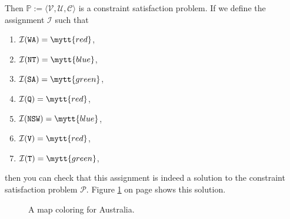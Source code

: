 Then $\mathbb{P} := \langle \mathcal{V}, \mathcal{U}, \mathcal{C} \rangle$ is a constraint satisfaction problem.  
If we define the assignment $\mathcal{I}$ such that
\begin{enumerate}
\item $\mathcal{I}(\mathtt{WA}) = \mytt{red}$,
\item $\mathcal{I}(\mathtt{NT}) = \mytt{blue}$,
\item $\mathcal{I}(\mathtt{SA}) = \mytt{green}$,
\item $\mathcal{I}(\mathtt{Q}) = \mytt{red}$,
\item $\mathcal{I}(\mathtt{NSW}) = \mytt{blue}$,
\item $\mathcal{I}(\mathtt{V}) = \mytt{red}$,
\item $\mathcal{I}(\mathtt{T}) = \mytt{green}$,
\end{enumerate}
then you can check that this assignment  is indeed a solution to the constraint satisfaction problem $\mathcal{P}$.
Figure \ref{fig:australia-solution.png} on page \pageref{fig:australia-solution.png} shows this solution.

\begin{figure}[!ht]
  \centering
  \caption{A map coloring for Australia.}
  \label{fig:australia-solution.png}
\end{figure}


